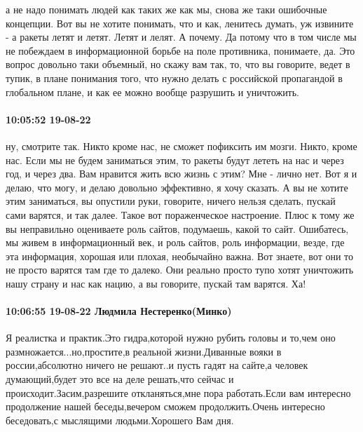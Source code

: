 а не надо понимать людей как таких же как мы, снова же таки ошибочные
концепции. Вот вы не хотите понимать, что и как, ленитесь думать, уж извините -
а ракеты летят и летят. Летят и лелят. А почему. Да потому что в том числе мы
не побеждаем в информационной борьбе на поле противника, понимаете, да. Это
вопрос довольно таки объемный, но скажу вам так, то, что вы говорите, ведет в
тупик, в плане понимания того, что нужно делать с российской пропагандой в
глобальном плане, и как ее можно вообще разрушить и уничтожить.

\paragraph{10:05:52 19-08-22}

ну, смотрите так. Никто кроме нас, не сможет пофиксить им мозги. Никто, кроме
нас. Если мы не будем заниматься этим, то ракеты будут лететь на нас и через
год, и через два. Вам нравится жить всю жизнь с этим? Мне - лично нет. Вот я и
делаю, что могу, и делаю довольно эффективно, я хочу сказать. А вы не хотите
этим заниматься, вы опустили руки, говорите, ничего нельзя сделать, пускай сами
варятся, и так далее. Такое вот пораженческое настроение. Плюс к тому же вы
неправильно оцениваете роль сайтов, подумаешь, какой то сайт. Ошибатесь, мы
живем в информационный век, и роль сайтов, роль информации, везде, где эта
информация, хорошая или плохая, необычайно важна. Вот знаете, вот они то не
просто варятся там где то далеко. Они реально просто тупо хотят уничтожить нашу
страну и нас как нацию, а вы говорите, пускай там варятся. Ха!

\paragraph{10:06:55 19-08-22 Людмила Нестеренко(Минко)}

Я реалистка и практик.Это гидра,которой нужно рубить головы и то,чем оно
размножается...но,простите,в реальной жизни.Диванные вояки в россии,абсолютно
ничего не решают..и пусть гадят на сайте,а человек думающий,будет это все на
деле решать,что сейчас и происходит.Засим,разрешите откланяться,мне пора
работать.Если вам интересно продолжение нашей беседы,вечером сможем
продолжить.Очень интересно беседовать,с мыслящими людьми.Хорошего Вам дня.
